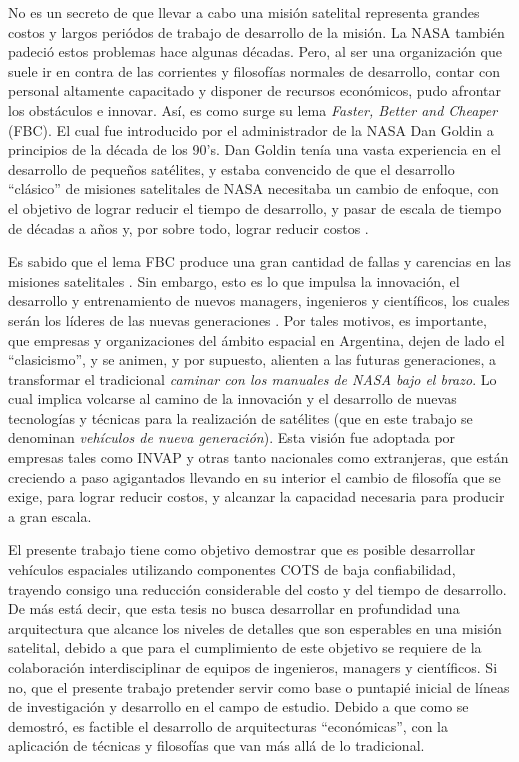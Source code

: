 No es un secreto de que llevar a cabo una misión satelital representa grandes costos
y largos periódos de trabajo de desarrollo de la misión.
La NASA también padeció estos problemas hace algunas décadas.
Pero, al ser una organización que suele ir en contra de las corrientes y filosofías
normales de desarrollo, contar con personal altamente capacitado y disponer de recursos
económicos, pudo afrontar los obstáculos e innovar. Así, es como
surge su lema \textit{Faster, Better and Cheaper} (FBC).
El cual fue introducido por el administrador de la NASA Dan Goldin a
principios de la década de los 90's. Dan Goldin tenía una vasta experiencia en
el desarrollo de pequeños satélites, y estaba convencido de que el desarrollo
``clásico'' de misiones satelitales de NASA necesitaba un cambio de enfoque,
con el objetivo de lograr reducir el tiempo de desarrollo, y pasar de escala de tiempo de
décadas a años y, por sobre todo, lograr reducir costos \citep{Paxton07}.

Es sabido que el lema FBC produce una gran cantidad de fallas y
carencias en las misiones satelitales \citep{Paxton07}. Sin embargo,
esto es lo que impulsa la innovación, el desarrollo y entrenamiento de nuevos
managers, ingenieros y científicos, los cuales serán los líderes de las
nuevas generaciones \citep{Paxton07}. Por tales motivos, es importante,
que empresas y organizaciones del ámbito espacial en Argentina, dejen
de lado el ``clasicismo'', y se animen, y por supuesto, alienten a las futuras
generaciones, a transformar el tradicional \textit{caminar con los manuales de NASA bajo
  el brazo}. Lo cual implica volcarse al camino de la   innovación y el desarrollo
de nuevas tecnologías y técnicas para la realización de satélites (que en este trabajo se denominan
\textit{vehículos de nueva generación}). Esta visión fue adoptada por empresas tales como INVAP
y otras tanto nacionales como extranjeras,  que están creciendo a paso agigantados llevando
en su interior el cambio de filosofía que se exige, para lograr reducir costos, y 
alcanzar la capacidad necesaria para producir a gran escala.

El presente  trabajo tiene como objetivo demostrar que es posible desarrollar
vehículos espaciales utilizando componentes COTS de baja confiabilidad, trayendo
consigo una reducción considerable del costo y del tiempo de desarrollo. De más está
decir, que esta tesis no busca desarrollar en profundidad una arquitectura
que alcance los niveles de detalles que son esperables en una misión satelital, debido a que para
el cumplimiento de este objetivo se requiere de la colaboración interdisciplinar de equipos de 
ingenieros, managers y científicos. Si no, que el presente trabajo pretender servir como
base o puntapié inicial de líneas de investigación y desarrollo en el campo de estudio.
Debido a que como se demostró, es factible el desarrollo de arquitecturas
``económicas'', con la aplicación de técnicas y filosofías que van más allá de lo tradicional.

